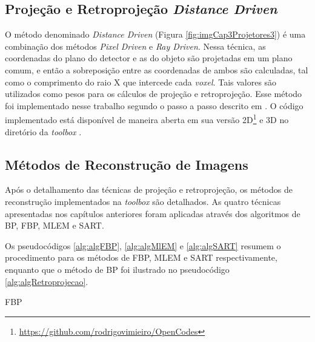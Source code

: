 \subsection{Projeção e Retroprojeção \textit{Distance Driven}} 

O método denominado \textit{Distance Driven} (Figura \ref{fig:imgCap3Projetores3}) é uma combinação dos métodos \textit{Pixel Driven} e \textit{Ray Driven}. Nessa técnica, as coordenadas do plano do detector e as do objeto são projetadas em um plano comum, e então a sobreposição entre as coordenadas de ambos são calculadas, tal como o comprimento do raio X que intercede cada \textit{voxel}. Tais valores são utilizados como pesos para os cálculos de projeção e retroprojeção. Esse método foi implementado nesse trabalho segundo o passo a passo descrito em . O código implementado está disponível de maneira aberta em sua versão \acs{2D}\footnote{\url{https://github.com/rodrigovimieiro/OpenCodes}} e \acs{3D} no diretório da \textit{toolbox} \cite{de2002distance,de2004distance}.

\subsection{Métodos de Reconstrução de Imagens} 

Após o detalhamento das técnicas de projeção e retroprojeção, os métodos de reconstrução implementados na \textit{toolbox} são detalhados. As quatro técnicas apresentadas nos capítulos anteriores foram aplicadas através dos algoritmos de \acs{BP}, \acs{FBP}, \acs{MLEM} e \acs{SART}. 

Os pseudocódigos \ref{alg:algFBP}, \ref{alg:algMlEM} e \ref{alg:algSART} resumem o procedimento para os métodos de \acs{FBP}, \acs{MLEM} e \acs{SART} respectivamente, enquanto que o método de \acs{BP} foi ilustrado no pseudocódigo \ref{alg:algRetroprojecao}.  

\begin{algorithm}[htb]
	\caption{\acs{FBP}}
	\label{alg:algFBP}
\end{algorithm}

